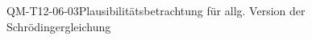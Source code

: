 
\begin{REM}{QM-T12-06-03}{Plausibilitätsbetrachtung für allg. Version der Schrödingergleichung}
\end{REM}
